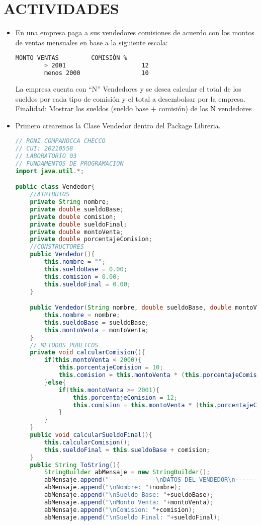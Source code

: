 \documentclass{article}
\begin{document}
    \section{ACTIVIDADES}
	\begin{itemize}
        \subsection{EJERCICIO RESUELTO}
		\item En una empresa paga a sus vendedores comisiones de acuerdo con los montos de ventas mensuales en base a la siguiente escala:
    \begin{lstlisting}[language=bash]
        MONTO VENTAS         COMISIÓN %
        > 2001                     12
        menos 2000                 10
    \end{lstlisting}
        La empresa cuenta con “N” Vendedores y se desea calcular el total de los sueldos por cada tipo de comisión y el total a desembolsar por la empresa. Finalidad: Mostrar los sueldos (sueldo base + comisión) de los N vendedores
        \item Primero crearemos la Clase Vendedor dentro del Package Libreria.
        \begin{lstlisting}[language=java]
// RONI COMPANOCCA CHECCO
// CUI: 20210558
// LABORATORIO 03
// FUNDAMENTOS DE PROGRAMACION 
import java.util.*;

public class Vendedor{
    //ATRIBUTOS
    private String nombre;
    private double sueldoBase;
    private double comision;
    private double sueldoFinal;
    private double montoVenta;
    private double porcentajeComision;
    //CONSTRUCTORES
    public Vendedor(){
        this.nombre = "";
        this.sueldoBase = 0.00;
        this.comision = 0.00;
        this.sueldoFinal = 0.00;
    }

    public Vendedor(String nombre, double sueldoBase, double montoVenta){
        this.nombre = nombre;
        this.sueldoBase = sueldoBase;
        this.montoVenta = montoVenta;
    }
    // METODOS PUBLICOS
    private void calcularComision(){
        if(this.montoVenta < 2000){
            this.porcentajeComision = 10;
            this.comision = this.montoVenta * (this.porcentajeComision/100);
        }else{
            if(this.montoVenta >= 2001){
                this.porcentajeComision = 12;
                this.comision = this.montoVenta * (this.porcentajeComision/100);
            }
        }
    }
    public void calcularSueldoFinal(){
        this.calcularComision();
        this.sueldoFinal = this.sueldoBase + comision;
    }
    public String ToString(){
        StringBuilder abMensaje = new StringBuilder();
        abMensaje.append("-------------\nDATOS DEL VENDEDOR\n-----------");
        abMensaje.append("\nNombre: "+nombre);
        abMensaje.append("\nSueldo Base: "+sueldoBase);
        abMensaje.append("\nMonto Venta: "+montoVenta);
        abMensaje.append("\nComision: "+comision);
        abMensaje.append("\nSueldo Final: "+sueldoFinal);


\end{lstlisting}
\end{itemize}
\end{document}
